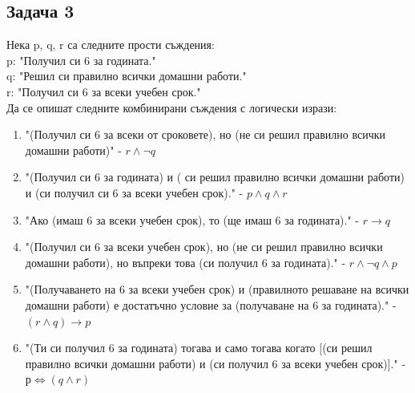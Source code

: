 \documentclass[fleqn, 12pt]{article}
\theoremstyle{definition}
\begin{document}
\subsection*{Задача 3}
Нека p, q, r са следните прости съждения:\\
p: "Получил си 6 за годината." \\
q: "Решил си правилно всички домашни работи." \\
r: "Получил си 6 за всеки учебен срок." \\
Да се опишат следните комбинирани съждения с логически изрази:
\begin{enumerate}
\item  "(Получил си 6 за всеки от сроковете), но (не си решил правилно всички домашни работи)" - $r \land \neg q$
\item "(Получил си 6 за годината) и ( си решил правилно всички домашни работи) и (си получил си 6 за всеки учебен срок)." - $p \land q \land r$
\item "Ако (имаш 6 за всеки учебен срок), то (ще имаш 6 за годината)." - $ r \to q$
\item "(Получил си 6 за всеки учебен срок), но (не си решил правилно всички домашни работи), но въпреки това (си получил 6 за годината)." - $r \land  \neg q \land p$
\item "(Получаването на 6 за всеки учебен срок) и (правилното решаване на всички домашни работи) е достатъчно условие за (получаване на 6 за годината)." - $(r \land q) \to p$
\item "(Ти си получил 6 за годината) тогава и само тогава когато [(си решил  правилно всички домашни работи) и (си получил 6 за всеки учебен срок)]." - $р \Leftrightarrow (q \land r)$ 
\end{enumerate}
\end{document}
